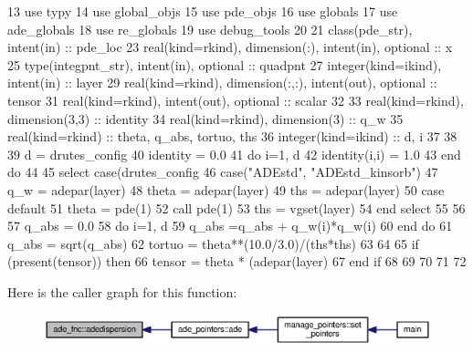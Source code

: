 \begin{DoxyCode}
13       \textcolor{keywordtype}{use }typy
14       \textcolor{keywordtype}{use }global_objs
15       \textcolor{keywordtype}{use }pde_objs
16       \textcolor{keywordtype}{use }globals
17       \textcolor{keywordtype}{use }ade_globals
18       \textcolor{keywordtype}{use }re_globals
19       \textcolor{keywordtype}{use }debug_tools
20       
21       \textcolor{keywordtype}{class}(pde_str), \textcolor{keywordtype}{intent(in)} :: pde\_loc
23       \textcolor{keywordtype}{real(kind=rkind)}, \textcolor{keywordtype}{dimension(:)}, \textcolor{keywordtype}{intent(in)}, \textcolor{keywordtype}{optional}    :: x
25       \textcolor{keywordtype}{type}(integpnt_str), \textcolor{keywordtype}{intent(in)}, \textcolor{keywordtype}{optional} :: quadpnt
27       \textcolor{keywordtype}{integer(kind=ikind)}, \textcolor{keywordtype}{intent(in)} :: layer
29       \textcolor{keywordtype}{real(kind=rkind)}, \textcolor{keywordtype}{dimension(:,:)}, \textcolor{keywordtype}{intent(out)}, \textcolor{keywordtype}{optional} :: tensor
31       \textcolor{keywordtype}{real(kind=rkind)}, \textcolor{keywordtype}{intent(out)}, \textcolor{keywordtype}{optional}                 :: scalar
32       
33       \textcolor{keywordtype}{real(kind=rkind)}, \textcolor{keywordtype}{dimension(3,3)} :: identity
34       \textcolor{keywordtype}{real(kind=rkind)}, \textcolor{keywordtype}{dimension(3)} :: q\_w
35       \textcolor{keywordtype}{real(kind=rkind)} :: theta, q\_abs, tortuo, ths
36       \textcolor{keywordtype}{integer(kind=ikind)} :: d, i
37       
38      
39       d = drutes_config%
40       identity = 0.0
41       \textcolor{keywordflow}{do} i=1, d
42         identity(i,i) = 1.0
43 \textcolor{keywordflow}{      end do}
44       
45       \textcolor{keywordflow}{select case}(drutes_config%
46         \textcolor{keywordflow}{case}(\textcolor{stringliteral}{"ADEstd"}, \textcolor{stringliteral}{"ADEstd\_kinsorb"})
47           q\_w = adepar(layer)%
48           theta = adepar(layer)%
49           ths = adepar(layer)%
50 \textcolor{keywordflow}{        case default}
51           theta = pde(1)%
52           \textcolor{keyword}{call }pde(1)%
53           ths = vgset(layer)%
54 \textcolor{keywordflow}{      end select}
55       
56 
57       q\_abs = 0.0
58       \textcolor{keywordflow}{do} i=1, d
59         q\_abs =q\_abs + q\_w(i)*q\_w(i)
60 \textcolor{keywordflow}{      end do}
61       q\_abs = sqrt(q\_abs)
62       tortuo = theta**(10.0/3.0)/(ths*ths)
63       
64       
65       \textcolor{keywordflow}{if} (\textcolor{keyword}{present}(tensor)) \textcolor{keywordflow}{then}
66         tensor = theta * (adepar(layer)%
67 \textcolor{comment}{}\textcolor{keywordflow}{      end if}
68       
69 
70       
71       
72     
\end{DoxyCode}


Here is the caller graph for this function\+:\nopagebreak
\begin{figure}[H]
\begin{center}
\leavevmode
\includegraphics[width=350pt]{namespaceade__fnc_a41110eb40a739c1a15d966c122ab3b8b_icgraph}
\end{center}
\end{figure}


